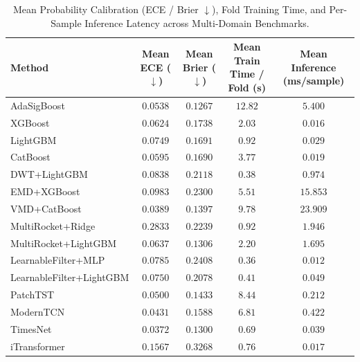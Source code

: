 \begin{table}[h]
\centering
\caption{Mean Probability Calibration (ECE / Brier $\downarrow$), Fold Training Time, and Per-Sample Inference Latency across Multi-Domain Benchmarks.}
\label{tab:calibration_compute}
\begin{tabular}{lcccc}
\toprule
Method & Mean ECE ($\downarrow$) & Mean Brier ($\downarrow$) & Mean Train Time / Fold (s) & Mean Inference (ms/sample) \\
\midrule
AdaSigBoost & $0.0538$ & $0.1267$ & $12.82$ & $5.400$ \\
XGBoost & $0.0624$ & $0.1738$ & $2.03$ & $0.016$ \\
LightGBM & $0.0749$ & $0.1691$ & $0.92$ & $0.029$ \\
CatBoost & $0.0595$ & $0.1690$ & $3.77$ & $0.019$ \\
DWT+LightGBM & $0.0838$ & $0.2118$ & $0.38$ & $0.974$ \\
EMD+XGBoost & $0.0983$ & $0.2300$ & $5.51$ & $15.853$ \\
VMD+CatBoost & $0.0389$ & $0.1397$ & $9.78$ & $23.909$ \\
MultiRocket+Ridge & $0.2833$ & $0.2239$ & $0.92$ & $1.946$ \\
MultiRocket+LightGBM & $0.0637$ & $0.1306$ & $2.20$ & $1.695$ \\
LearnableFilter+MLP & $0.0785$ & $0.2408$ & $0.36$ & $0.012$ \\
LearnableFilter+LightGBM & $0.0750$ & $0.2078$ & $0.41$ & $0.049$ \\
PatchTST & $0.0500$ & $0.1433$ & $8.44$ & $0.212$ \\
ModernTCN & $0.0431$ & $0.1588$ & $6.81$ & $0.422$ \\
TimesNet & $0.0372$ & $0.1300$ & $0.69$ & $0.039$ \\
iTransformer & $0.1567$ & $0.3268$ & $0.76$ & $0.017$ \\
\bottomrule
\end{tabular}
\end{table}

